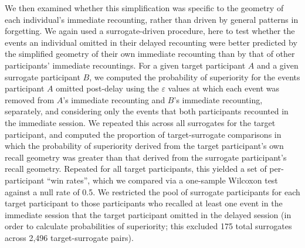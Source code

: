 \documentclass[10pt]{article}
\begin{document}
We then examined whether this simplification was specific to the geometry of each individual's immediate recounting, rather than driven by general patterns in forgetting.
We again used a surrogate-driven procedure, here to test whether the events an individual omitted in their delayed recounting were better predicted by the simplified geometry of their own immediate recounting than by that of other participants' immediate recountings.
For a given target participant $A$ and a given surrogate participant $B$, we computed the probability of superiority for the events participant $A$ omitted post-delay using the $\varepsilon$ values at which each event was removed from $A$'s immediate recounting and $B$'s immediate recounting, separately, and considering only the events that both participants recounted in the immediate session.
We repeated this across all surrogates for the target participant, and computed the proportion of target-surrogate comparisons in which the probability of superiority derived from the target participant's own recall geometry was greater than that derived from the surrogate participant's recall geometry.
Repeated for all target participants, this yielded a set of per-participant ``win rates'', which we compared via a one-sample Wilcoxon test against a null rate of 0.5. 
We restricted the pool of surrogate participants for each target participant to those participants who recalled at least one event in the immediate session that the target participant omitted in the delayed session (in order to calculate probabilities of superiority; this excluded 175 total surrogates across 2,496 target-surrogate pairs).
\end{document}
